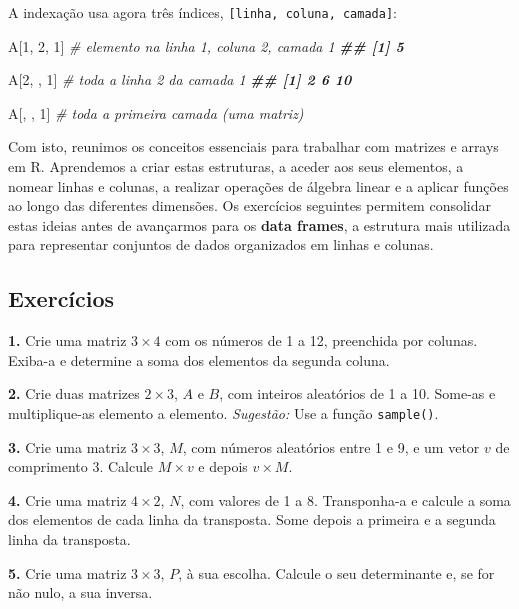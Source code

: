 \documentclass[
  portuguese,
  11pt,
  openany]{book}
\newenvironment{Shaded}{\begin{snugshade}}{\end{snugshade}}
\newcommand{\CommentTok}[1]{\textcolor[rgb]{0.56,0.35,0.01}{\textit{#1}}}
\newcommand{\DecValTok}[1]{\textcolor[rgb]{0.00,0.00,0.81}{#1}}
\newcommand{\DocumentationTok}[1]{\textcolor[rgb]{0.56,0.35,0.01}{\textbf{\textit{#1}}}}
\newcommand{\NormalTok}[1]{#1}
\begin{document}
A indexação usa agora três índices, \texttt{{[}linha,\ coluna,\ camada{]}}:

\begin{Shaded}
\begin{Highlighting}[]
\NormalTok{A[}\DecValTok{1}\NormalTok{, }\DecValTok{2}\NormalTok{, }\DecValTok{1}\NormalTok{]     }\CommentTok{\# elemento na linha 1, coluna 2, camada 1}
\DocumentationTok{\#\# [1] 5}

\NormalTok{A[}\DecValTok{2}\NormalTok{, , }\DecValTok{1}\NormalTok{]      }\CommentTok{\# toda a linha 2 da camada 1}
\DocumentationTok{\#\# [1]  2  6 10}

\NormalTok{A[, , }\DecValTok{1}\NormalTok{]       }\CommentTok{\# toda a primeira camada (uma matriz)}
\end{Highlighting}
\end{Shaded}

Com isto, reunimos os conceitos essenciais para trabalhar com matrizes e arrays em R. Aprendemos a criar estas estruturas, a aceder aos seus elementos, a nomear linhas e colunas, a realizar operações de álgebra linear e a aplicar funções ao longo das diferentes dimensões. Os exercícios seguintes permitem consolidar estas ideias antes de avançarmos para os \textbf{data frames}, a estrutura mais utilizada para representar conjuntos de dados organizados em linhas e colunas.

\subsection{Exercícios}\label{exercuxedcios-3}

\textbf{1.} Crie uma matriz \(3 \times 4\) com os números de 1 a 12, preenchida por
colunas. Exiba-a e determine a soma dos elementos da segunda coluna.

\textbf{2.} Crie duas matrizes \(2 \times 3\), \(A\) e \(B\), com inteiros aleatórios de 1 a
10. Some-as e multiplique-as elemento a elemento.
\emph{Sugestão:} Use a função \texttt{sample()}.

\textbf{3.} Crie uma matriz \(3 \times 3\), \(M\), com números aleatórios entre 1 e 9, e um
vetor \(v\) de comprimento 3. Calcule \(M \times v\) e depois \(v \times M\).

\textbf{4.} Crie uma matriz \(4 \times 2\), \(N\), com valores de 1 a 8. Transponha-a e
calcule a soma dos elementos de cada linha da transposta. Some depois a primeira e
a segunda linha da transposta.

\textbf{5.} Crie uma matriz \(3 \times 3\), \(P\), à sua escolha. Calcule o seu
determinante e, se for não nulo, a sua inversa.
\end{document}
